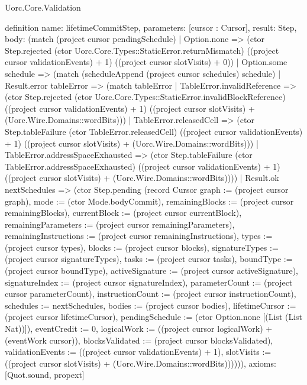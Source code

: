 \begin{lexlean}{Uorc.Core.Validation}
\begin{semanticmodule}
definition{
  name: lifetimeCommitStep,
  parameters: [cursor : Cursor],
  result: Step,
  body: (match (project cursor pendingSchedule)
    | Option.none => (ctor Step.rejected (ctor Uorc.Core.Types::StaticError.returnMismatch) ((project cursor validationEvents) + 1) ((project cursor slotVisits) + 0))
    | Option.some schedule => (match (scheduleAppend (project cursor schedules) schedule)
      | Result.error tableError => (match tableError
        | TableError.invalidReference => (ctor Step.rejected (ctor Uorc.Core.Types::StaticError.invalidBlockReference) ((project cursor validationEvents) + 1) ((project cursor slotVisits) + (Uorc.Wire.Domains::wordBits)))
        | TableError.releasedCell => (ctor Step.tableFailure (ctor TableError.releasedCell) ((project cursor validationEvents) + 1) ((project cursor slotVisits) + (Uorc.Wire.Domains::wordBits)))
        | TableError.addressSpaceExhausted => (ctor Step.tableFailure (ctor TableError.addressSpaceExhausted) ((project cursor validationEvents) + 1) ((project cursor slotVisits) + (Uorc.Wire.Domains::wordBits))))
      | Result.ok nextSchedules => (ctor Step.pending (record Cursor {graph := (project cursor graph), mode := (ctor Mode.bodyCommit), remainingBlocks := (project cursor remainingBlocks), currentBlock := (project cursor currentBlock), remainingParameters := (project cursor remainingParameters), remainingInstructions := (project cursor remainingInstructions), types := (project cursor types), blocks := (project cursor blocks), signatureTypes := (project cursor signatureTypes), tasks := (project cursor tasks), boundType := (project cursor boundType), activeSignature := (project cursor activeSignature), signatureIndex := (project cursor signatureIndex), parameterCount := (project cursor parameterCount), instructionCount := (project cursor instructionCount), schedules := nextSchedules, bodies := (project cursor bodies), lifetimeCursor := (project cursor lifetimeCursor), pendingSchedule := (ctor Option.none [(List (List Nat))]), eventCredit := 0, logicalWork := ((project cursor logicalWork) + (eventWork cursor)), blocksValidated := (project cursor blocksValidated), validationEvents := ((project cursor validationEvents) + 1), slotVisits := ((project cursor slotVisits) + (Uorc.Wire.Domains::wordBits))})))),
  axioms: [Quot.sound, propext]
}


\end{semanticmodule}
\end{lexlean}
